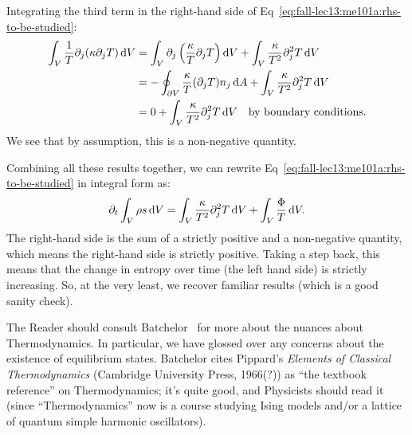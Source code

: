 \begin{node}
Integrating the third term in the right-hand side of Eq~\eqref{eq:fall-lec13:me101a:rhs-to-be-studied}:
\begin{subequations}
  \begin{align}
\int_{V}\frac{1}{T}\partial_{j}(\kappa\partial_{j}T)\,\mathrm{d} V
&=\int_{V}\partial_{j}\left(\frac{\kappa}{T}\partial_{j}T\right)\mathrm{d} V
+\int_{V}\frac{\kappa}{T^{2}}\partial_{j}^{2}T\,\mathrm{d} V\\
&=-\oint_{\partial V}\frac{\kappa}{T}(\partial_{j}T)n_{j}\,\mathrm{d} A+\int_{V}\frac{\kappa}{T^{2}}\partial_{j}^{2}T\,\mathrm{d} V\\
&=0+\int_{V}\frac{\kappa}{T^{2}}\partial_{j}^{2}T\,\mathrm{d} V\quad\mbox{by boundary conditions}.
  \end{align}
\end{subequations}
We see that by assumption, this is a non-negative quantity.
\end{node}

\begin{node}
Combining all these results together, we can rewrite Eq~\eqref{eq:fall-lec13:me101a:rhs-to-be-studied}
in integral form as:
\begin{equation}
\partial_{t}\int_{V}\rho s\,\mathrm{d} V =
\int_{V}\frac{\kappa}{T^{2}}\partial_{j}^{2}T\,\mathrm{d} V+\int_{V}\frac{\Phi}{T}\,\mathrm{d} V.
\end{equation}
The right-hand side is the sum of a strictly positive and a
non-negative quantity, which means the right-hand side is strictly
positive. Taking a step back, this means that the change in entropy
over time (the left hand side) is strictly increasing. So, at the very
least, we recover familiar results (which is a good sanity check).
\end{node}

\begin{remark}
The Reader should consult Batchelor~\cite[\S1.6~\&~\S3.4]{batchelor1973introduction}
for more about the nuances about Thermodynamics. In particular, we
have glossed over any concerns about the existence of equilibrium
states. Batchelor cites Pippard's \textit{Elements of Classical Thermodynamics}
(Cambridge University Press, 1966(?)) as ``the textbook reference''
on Thermodynamics; it's quite good, and Physicists should read it
(since ``Thermodynamics'' now is a course studying Ising models and/or a lattice
of quantum simple harmonic oscillators).
\end{remark}